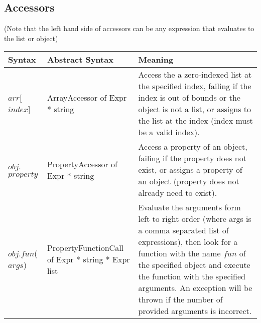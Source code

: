 \documentclass{article}
\begin{document}
\subsection{Accessors}
(Note that the left hand side of accessors can be any expression that evaluates to the list or object)
\begin{center}
 \begin{tabularx}{\linewidth}{|X|X|X|} 
 \hline
 Syntax & Abstract Syntax & Meaning \\
 \hline
 $arr$[$index$] & ArrayAccessor of Expr * string & Access the a zero-indexed list at the specified index, failing if the index is out of bounds or the object is not a list, or assigns to the list at the index (index must be a valid index).\\ 
 \hline
 $obj$.$property$ & PropertyAccessor of Expr * string & Access a property of an object, failing if the property does not exist, or assigns a property of an object (property does not already need to exist). \\
 \hline
 $obj$.$fun$($args$) & PropertyFunctionCall of Expr * string * Expr list & Evaluate the arguments form left to right order (where args is a comma separated list of expressions), then look for a function with the name $fun$ of the specified object and execute the function with the specified arguments. An exception will be thrown if the number of provided arguments is incorrect. \\
 \hline
\end{tabularx}
\end{center}
\end{document}
